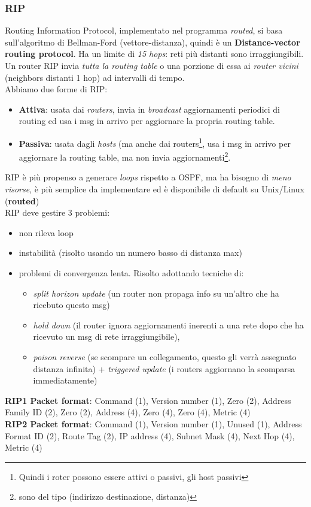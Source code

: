\documentclass[a4paper,11pt]{article}
\begin{document}
\subsubsection{RIP}
Routing Information Protocol, implementato nel programma \textit{routed}, si basa sull'algoritmo di Bellman-Ford (vettore-distanza), quindi è un \textbf{Distance-vector routing protocol}.
Ha un limite di \textit{15 hops}: reti più distanti sono irraggiungibili.\\
Un router RIP invia \textit{tutta la routing table} o una porzione di essa ai \textit{router vicini} (neighbors distanti 1 hop) ad intervalli di tempo.\\
Abbiamo due forme di RIP:
\begin{itemize}
\item\textbf{Attiva}: usata dai \textit{routers}, invia in \textit{broadcast} aggiornamenti periodici di routing ed usa i msg in arrivo per aggiornare la propria routing table.
\item\textbf{Passiva}: usata dagli \textit{hosts} (ma anche dai routers\footnote{Quindi i roter possono essere attivi o passivi, gli host passivi}, usa i msg in arrivo per aggiornare la routing table, ma non invia aggiornamenti\footnote{sono del tipo (indirizzo destinazione, distanza)}.
\end{itemize}                                                                                                               RIP è più propenso a generare \textit{loops} rispetto a OSPF, ma ha bisogno di \textit{meno risorse}, è più semplice da implementare ed è disponibile di default su Unix/Linux (\textbf{routed})\\
RIP deve gestire 3 problemi:
\begin{itemize}
\item non rileva loop
\item instabilità (risolto usando un numero basso di distanza max)
\item problemi di convergenza lenta. Risolto adottando tecniche di: \begin{itemize}
\item\textit{split horizon update} (un router non propaga info su un'altro che ha ricebuto questo msg)
\item\textit{hold down} (il router ignora aggiornamenti inerenti a una rete dopo che ha ricevuto un msg di rete irraggiungibile), \item\textit{poison reverse} (se scompare un collegamento, questo gli verrà assegnato distanza infinita) + \textit{triggered update} (i routers aggiornano la scomparsa immediatamente)
\end{itemize}
\end{itemize}
\textbf{RIP1 Packet format}: Command (1), Version number (1), Zero (2), Address Family ID (2), Zero (2), Address (4), Zero (4), Zero (4), Metric (4)\\
\textbf{RIP2 Packet format}: Command (1), Version number (1), Unused (1), Address Format ID (2), Route Tag (2), IP address (4), Subnet Mask (4), Next Hop (4), Metric (4)
\newpage
\end{document}
